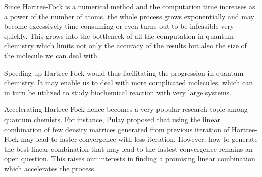 \documentclass[twoside]{article}
\begin{document}
Since Hartree-Fock is a numerical method and the computation time increases as a power of the number of atoms, the whole process grows exponentially and may become excessively time-consuming or even turns out to be infeasible very quickly.
This grows into the bottleneck of all the computation in quantum chemistry which limits not only the accuracy of the results but also the size of the molecule we can deal with.

Speeding up Hartree-Fock would thus facilitating the progression in quantum chemistry. It may enable us to deal with more complicated molecules, which can in turn be utilized to study biochemical reaction with very large systems. 





Accelerating Hartree-Fock hence becomes a very popular research topic among quantum chemists. For instance, Pulay \cite{Pulay1980} proposed that using the linear combination of few density matrices generated from previous iteration of Hartree-Fock may lead to faster convergence with less iteration. However, how to generate the best linear combination that may lead to the fastest convergence remains an open question. This raises our interests in finding a promising linear combination which accelerates the process. %


\end{document}
